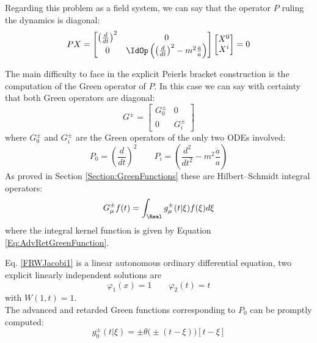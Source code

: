 \documentclass[Main]{subfiles}
\begin{document}
			Regarding this problem as a field system, we can say that the operator $P$ ruling the dynamics is diagonal:
			\begin{displaymath}
				P X =
				 \begin{bmatrix}  
				 \left(\frac{d}{dt}\right)^2 & 0 \\
				 0 & \IdOp \left( \left(\frac{d}{dt}\right)^2 - m^2 \frac{\ddot{a}}{a} \right)
				 \end{bmatrix}
				 \begin{bmatrix} X^0 \\ X^i  \end{bmatrix}
				 = 0
			\end{displaymath}
			
			The main difficulty to face in the explicit Peierls bracket construction is the computation of the Green operator of $P$.
			In this case we can say with certainty that both Green operators are diagonal:
			\begin{displaymath}
				G^\pm =
				 \begin{bmatrix}  
				 G^\pm_0 & 0 \\
				 0 & G^\pm_i
				 \end{bmatrix}
			\end{displaymath}		
			where $G^\pm_0$ and $G^\pm_i$ are the Green operators of the only two ODEs involved:
			\begin{displaymath}
				P_0 = \left(\frac{d}{dt}\right)^2 \qquad P_i=\left( \frac{d^2}{dt^2} - m^2 \frac{\ddot{a}}{a} \right)
			\end{displaymath}
			As proved in Section \ref{Section:GreenFunctions} these are  Hilbert–Schmidt integral operators:
			\begin{displaymath}
				G^\pm_\mu f(t) = \int_\Real g^\pm_\mu( t \vert \xi ) f(\xi) d\xi
			\end{displaymath}
			where the integral kernel function is given by  Equation \ref{Eq:AdvRetGreenFunction}.
			
			Eq. \ref{FRWJacobi1} is a linear autonomous ordinary differential equation, two explicit linearly independent solutions are 
			\begin{displaymath}
				\varphi_1(x)=1 \qquad \varphi_2(t)=t
			\end{displaymath} 
			with $W(1,t)=1$. \\
			The advanced and retarded Green functions corresponding to $P_0$ can be promptly computed:
			\begin{equation}\label{SimpleGreenFunction}
				g^\pm_0(t \vert \xi) = \pm \theta\big(\pm(t-\xi)\big) \left[ t -\xi\right]
			\end{equation}
			
\end{document}
